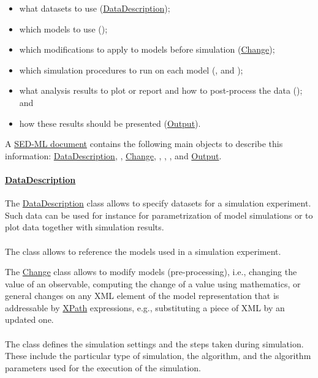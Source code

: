 \begin{itemize}
\item what datasets to use (\hyperref[class:dataDescription]{DataDescription});
\item which models to use (\Model);
\item which modifications to apply to models before simulation (\hyperref[class:change]{Change});
\item which simulation procedures to run on each model (\Simulation, and \Task);
\item what analysis results to plot or report and how to post-process the data (\DataGenerator); and
\item how these results should be presented (\hyperref[class:output]{Output}).
\end{itemize}

A \hyperref[class:sed-ml]{SED-ML document} contains the following main objects to describe this information: \hyperref[class:dataDescription]{DataDescription}, \Model, \hyperref[class:change]{Change}, \Simulation, \Task, \DataGenerator, and \hyperref[class:output]{Output}.

\paragraph*{\hyperref[class:dataDescription]{DataDescription}}
The \hyperref[class:dataDescription]{DataDescription} class allows to specify datasets for a simulation experiment. Such data can be used for instance for parametrization of model simulations or to plot data together with simulation results.

\paragraph*{\Model}
The \Model class allows to reference the models used in a simulation experiment.

The \hyperref[class:change]{Change} class allows to modify models (pre-processing), i.e., changing the value of an observable, computing the change of a value using mathematics, or general changes on any XML element of the model representation that is addressable by \hyperref[sec:xpath]{XPath} expressions, e.g., substituting a piece of XML by an updated one.

\paragraph*{\Simulation}
The \Simulation class defines the simulation settings and the steps taken during simulation. These include the particular type of simulation, the algorithm, and the algorithm parameters used for the execution of the simulation.

